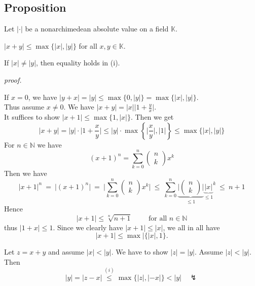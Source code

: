 \documentclass[12pt]{book}
\begin{document}
\begin{spacing}{1.3}
\subsection{Proposition} %
Let $|\cdot|$ be a nonarchimedean absolute value on a field $\mathbb{K}$.
\begin{compactenum}
\item $|x+y| \leqslant \max\{|x|, |y|\}$ for all $x,y \in \mathbb{K}$.
\item If $|x| \neq |y|$, then equality holds in (i).
\end{compactenum}
\textit{proof.}
\begin{compactenum}
\item If $x=0$, we have $|y+x|=|y|\leqslant \max\{0,|y|\}=\max\{|x|,|y|\}$.\\
Thus assume $x \neq 0$. We have $|x+y|=|x|\big\vert 1+\frac{y}{x}\big \vert$.\\
It suffices to show $|x+1| \leqslant \max\{1, |x|\}$. Then we get
$$|x+y|=|y| \cdot \Big\vert 1+\frac{x}{y}\Big\vert \leqslant |y| \cdot \max\left\{\Big\vert \frac{x}{y}\Big \vert, \vert1\vert\right\} \leqslant \max\{|x|, |y|\}$$
For $n \in \mathbb{N}$ we have
$$(x+1)^n=\sum_{k=0}^n \begin{pmatrix}n \\k \end{pmatrix} x^k$$
Then we have
$$|x+1|^n\ =\ \vert(x+1)^n \vert \ =\ \bigg\vert \sum_{k=0}^n \begin{pmatrix}n \\k\end{pmatrix} x^k \bigg \vert\ \leqslant \ \sum_{k=0}^n \underbrace{\bigg\vert \begin{pmatrix}n \\k \end{pmatrix} \bigg \vert}_{\leqslant 1} {\underbrace{\vert x \vert}_{\leqslant 1} }^k \ \leqslant \ n+1$$
Hence $$|x+1| \leqslant \sqrt[n]{n+1} \qquad \textrm{ for all }n \in \mathbb{N}$$thus $|1+x| \leqslant 1$. Since we clearly have $|x+1| \leqslant |x|$, we all in all have $$|x+1| \leqslant \max|\{|x|, 1\}.$$
\item Let $z=x+y$ and assume $|x|<|y|$. We have to show $|z|=|y|$. Assume $|z|<|y|$. Then
$$|y|=|z-x| \overset{(i)}{\leqslant} \max\{|z|, |-x|\} < |y| \quad \lightning$$
\end{compactenum}


\end{spacing}
\end{document}
